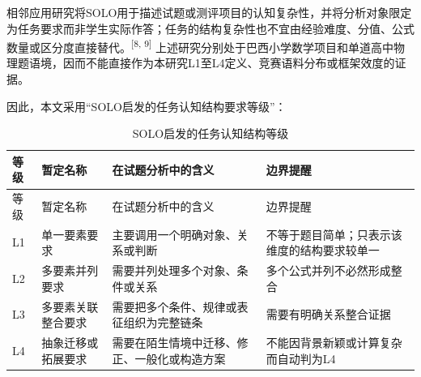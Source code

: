 \documentclass[
  12pt,
  a4paper]{ctexbook}
\begin{document}
相邻应用研究将SOLO用于描述试题或测评项目的认知复杂性，并将分析对象限定为任务要求而非学生实际作答；任务的结构复杂性也不宜由经验难度、分值、公式数量或区分度直接替代。\textsuperscript{[8, 9]}
上述研究分别处于巴西小学数学项目和单道高中物理题语境，因而不能直接作为本研究L1至L4定义、竞赛语料分布或框架效度的证据。

因此，本文采用``SOLO启发的任务认知结构要求等级''：

\begin{longtable}[]{@{}
  >{\raggedright\arraybackslash}p{}
  >{\raggedright\arraybackslash}p{}
  >{\raggedright\arraybackslash}p{}
  >{\raggedright\arraybackslash}p{}@{}}
\caption{SOLO启发的任务认知结构等级}\tabularnewline
\toprule\noalign{}
\rowcolor{ThesisPale}
\begin{minipage}[b]{\linewidth}\raggedright
等级
\end{minipage} & \begin{minipage}[b]{\linewidth}\raggedright
暂定名称
\end{minipage} & \begin{minipage}[b]{\linewidth}\raggedright
在试题分析中的含义
\end{minipage} & \begin{minipage}[b]{\linewidth}\raggedright
边界提醒
\end{minipage} \\
\midrule\noalign{}
\endfirsthead
\toprule\noalign{}
\rowcolor{ThesisPale}
\begin{minipage}[b]{\linewidth}\raggedright
等级
\end{minipage} & \begin{minipage}[b]{\linewidth}\raggedright
暂定名称
\end{minipage} & \begin{minipage}[b]{\linewidth}\raggedright
在试题分析中的含义
\end{minipage} & \begin{minipage}[b]{\linewidth}\raggedright
边界提醒
\end{minipage} \\
\midrule\noalign{}
\endhead
\bottomrule\noalign{}
\endlastfoot
L1 & 单一要素要求 & 主要调用一个明确对象、关系或判断 &
不等于题目简单；只表示该维度的结构要求较单一 \\
L2 & 多要素并列要求 & 需要并列处理多个对象、条件或关系 &
多个公式并列不必然形成整合 \\
L3 & 多要素关联整合要求 & 需要把多个条件、规律或表征组织为完整链条 &
需要有明确关系整合证据 \\
L4 & 抽象迁移或拓展要求 & 需要在陌生情境中迁移、修正、一般化或构造方案 &
不能因背景新颖或计算复杂而自动判为L4 \\
\end{longtable}
\end{document}
